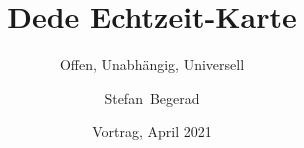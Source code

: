 


\usepackage{hyperref}

\usebackgroundtemplate

\usepackage{tikz}

\title[Dede]%
{Dede Echtzeit-Karte}

\subtitle{Offen, Unabhängig, Universell}

\author[Begerad]%
{Stefan~Begerad}

\date[April 2021]%
{Vortrag, April 2021}

